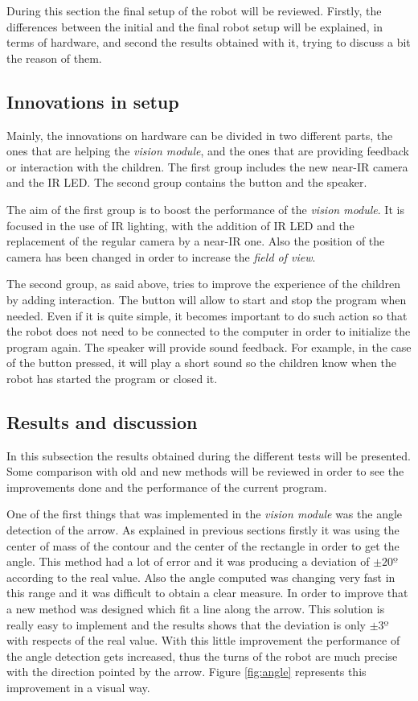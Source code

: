During this section the final setup of the robot will be reviewed. Firstly, the differences between the initial and the final robot setup will be explained, in terms of hardware, and second the results obtained with it, trying to discuss a bit the reason of them.

\subsection{Innovations in setup}

Mainly, the innovations on hardware can be divided in two different parts, the ones that are helping the \textit{vision module}, and the ones that are providing feedback or interaction with the children. The first group includes the new near-IR camera and the IR LED. The second group contains the button and the speaker.

The aim of the first group is to boost the performance of the \textit{vision module}. It is focused in the use of IR lighting, with the addition of IR LED and the replacement of the regular camera by a near-IR one. Also the position of the camera has been changed in order to increase the \textit{field of view}.

The second group, as said above, tries to improve the experience of the children by adding interaction. The button will allow to start and stop the program when needed. Even if it is quite simple, it becomes important to do such action so that the robot does not need to be connected to the computer in order to initialize the program again. The speaker will provide sound feedback. For example, in the case of the button pressed, it will play a short sound so the children know when the robot has started the program or closed it.


\subsection{Results and discussion}

In this subsection the results obtained during the different tests will be presented. Some comparison with old and new methods will be reviewed in order to see the improvements done and the performance of the current program. 

One of the first things that was implemented in the \textit{vision module} was the angle detection of the arrow. As explained in previous sections firstly it was using the center of mass of the contour and the center of the rectangle in order to get the angle. This method had a lot of error and it was producing a deviation of $\pm 20º$ according to the real value. Also the angle computed was changing very fast in this range and it was difficult to obtain a clear measure. In order to improve that a new method was designed which fit a line along the arrow. This solution is really easy to implement and the results shows that the deviation is only $\pm 3º$ with respects of the real value. With this little improvement the performance of the angle detection gets increased, thus the turns of the robot are much precise with the direction pointed by the arrow. Figure \ref{fig:angle} represents this improvement in a visual way.

